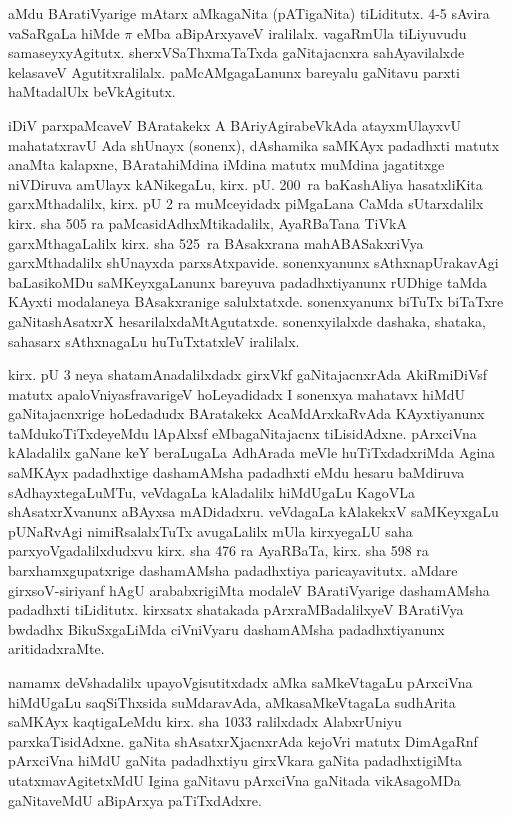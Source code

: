 aMdu BAratiVyarige mAtarx aMkagaNita (pATigaNita) tiLiditutx. {\rm 4-5} sAvira vaSaRgaLa hiMde $\pi$ eMba aBipArxyaveV iralilalx. vagaRmUla tiLiyuvudu samaseyx\-yAgitutx. sherxVSaThxmaTaTxda gaNitajacnxra sahAyavilalxde kelasaveV Agutitxralilalx. paMcAMgagaLanunx bareyalu gaNitavu parxti haMtadalUlx beVkAgitutx.

iDiV parxpaMcaveV BAratakekx A BAriyAgirabeVkAda atayxmUlayxvU mahatatxravU Ada shUnayx (sonenx), dAshamika saMKAyx padadhxti matutx anaMta kalapxne, BArata\break hiMdina iMdina matutx muMdina jagatitxge niVDiruva amUlayx kANikegaLu, kirx. pU. {\rm 200}~ra baKashAliya hasatxliKita garxMthadalilx, kirx. pU {\rm 2} ra muMceyidadx piMgaLana CaMda sUtarxdalilx kirx. sha {\rm 505} ra paMcasidAdhxMtikadalilx, AyaRBaTana TiVkA garxMthagaLalilx kirx. sha {\rm 525}~ra BAsakxrana mahABASakxriVya garxMthadalilx shUnayxda parxsAtxpavide. sonenxyanunx sAthxnapUrakavAgi baLasikoMDu saMKeyxgaLanunx bareyuva padadhxtiyanunx rUDhige taMda KAyxti modalaneya BAsakxranige salulxtatxde. sonenxyanunx biTuTx biTaTxre gaNitashAsatxrX hesarilalx\-daMtAgutatxde. sonenxyilalxde dashaka, shataka, sahasarx sAthxnagaLu huTuTxtatxleV iralilalx. 

kirx. pU {\rm 3} neya shatamAnadalilxdadx girxVkf gaNitajacnxrAda AkiRmiDiVsf matutx apaloV\-niyasfravarigeV hoLeyadidadx I sonenxya mahatavx hiMdU gaNitajacnxrige hoLedadudx BAratakekx AcaMdArxkaRvAda KAyxtiyanunx taMdukoTiTxdeyeMdu lApAlxsf eMba\break gaNitajacnx tiLisidAdxne. pArxciVna kAladalilx gaNane keY beraLugaLa AdhArada meVle huTiTxdadx\-riMda Agina saMKAyx padadhxtige dashamAMsha padadhxti eMdu hesaru baMdiruva sAdhayxtegaLuMTu, veVdagaLa kAladalilx hiMdUgaLu KagoVLa shAsatxrXvanunx aBAyxsa mADidadxru. veVdagaLa kAlakekxV saMKeyxgaLu pUNaRvAgi nimiRsalalxTuTx avugaLalilx mUla kirxyegaLU saha parxyoVgadalilxdudxvu kirx. sha {\rm 476} ra AyaRBaTa, kirx. sha {\rm 598} ra barxhamxgupatxrige dashamAMsha padadhxtiya paricayavitutx. aMdare girxsoV-siriyanf hAgU arababxrigiMta modaleV BAratiVyarige dashamAMsha padadhxti tiLiditutx. kirxsatx shatakada pArxraMBadalilxyeV BAratiVya bwdadhx BikuSxgaLiMda ciVniVyaru dashamAMsha padadhxtiyanunx aritidadxraMte.

namamx deVshadalilx upayoVgisutitxdadx aMka saMkeVtagaLu pArxciVna hiMdUgaLu saqSiThx\-sida suMdaravAda, aMkasaMkeVtagaLa sudhArita saMKAyx kaqtigaLeMdu kirx. sha {\rm 1033} ralilxdadx AlabxrUniyu parxkaTisidAdxne. gaNita shAsatxrXjacnxrAda kejoVri matutx DimAgaRnf pArxciVna hiMdU gaNita padadhxtiyu girxVkara gaNita padadhxtigiMta utatxmavAgitetxMdU Igina gaNitavu pArxciVna gaNitada vikAsagoMDa gaNitaveMdU aBipArxya paTiTxdAdxre.

